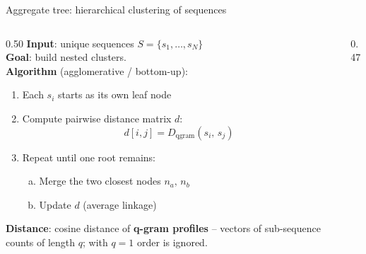 \documentclass[aspectratio=169,t]{beamer}
\begin{document}
\begin{frame}[shrink=5]{Aggregate tree: hierarchical clustering of sequences}
  \begin{columns}[T]
    \begin{column}{0.50\textwidth}
      \textbf{Input}: unique sequences $S = \{s_1,\ldots,s_N\}$\\[0.2cm]
      \textbf{Goal}: build nested clusters.\\[0.2cm]
      \textbf{Algorithm} (agglomerative / bottom-up):
      \begin{enumerate}
        \item Each $s_i$ starts as its own leaf node
        \item Compute pairwise distance matrix $d$:
              \[d[i,j] = D_{\text{qgram}}(s_i,\, s_j)\]
        \item Repeat until one root remains:
        \begin{enumerate}[a.]
          \item Merge the two closest nodes $n_a,\,n_b$
          \item Update $d$ (average linkage)
        \end{enumerate}
      \end{enumerate}
      \vspace{0.15cm}
      \textbf{Distance}: cosine distance of \textbf{q-gram profiles} -- vectors of sub-sequence counts of length $q$; with $q{=}1$ order is ignored.
    \end{column}
    \begin{column}{0.47\textwidth}
      \vspace{0.3cm}
      \begin{center}
\end{center}
\end{column}
\end{columns}
\end{frame}
\end{document}

